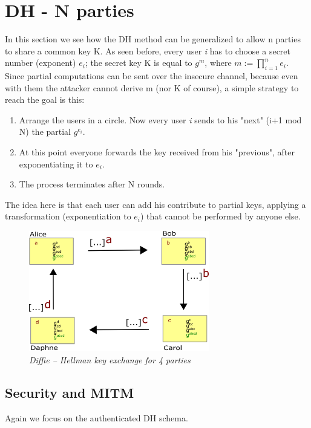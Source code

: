 \documentclass[11 pt]{article}
\begin{document}
\section{DH - N parties}
In this section we see how the DH method can be generalized to allow n parties to share a common key K. As seen before, every user \textit{i} has to choose a secret number (exponent) $e_i$; the secret key K is equal to $ g^m$, where $m:= \prod_{i=1}^{n} e_i$. Since partial computations can be sent over the insecure channel, because even with them the attacker cannot derive m (nor K of course), a simple strategy to reach the goal is this:

\begin{enumerate}
	\item Arrange the users in a circle. Now every user \textit{i} sends to his "next" (i+1 mod N) the partial $g^{e_i}$.
	\item At this point everyone forwards the key received from his "previous", after exponentiating it to $e_i$.
	\item The process terminates after N rounds.
\end{enumerate}
The idea here \cite{Wikipedia} is that each user can add his contribute to partial keys, applying a transformation (exponentiation to $e_i$) that cannot be performed by anyone else.

\begin{figure}[!ht]
	\centering %
	\includegraphics[width=0.7\textwidth]{4dh-hw4-1699981.png} %
	\caption{\textit{Diffie -- Hellman key exchange for 4 parties}} %
	\label{fig:4dh}
\end{figure}

\subsection{Security and MITM}
Again we focus on the authenticated DH schema.
\end{document}
